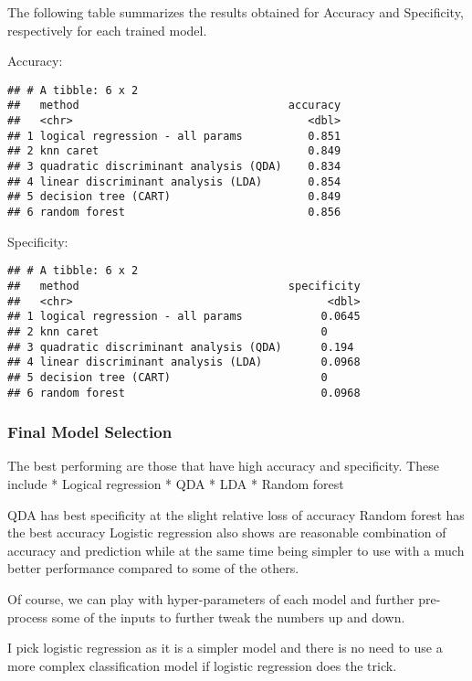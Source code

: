 \documentclass[]{article}
\begin{document}
The following table summarizes the results obtained for Accuracy and
Specificity, respectively for each trained model.

Accuracy:

\begin{verbatim}
## # A tibble: 6 x 2
##   method                                accuracy
##   <chr>                                    <dbl>
## 1 logical regression - all params          0.851
## 2 knn caret                                0.849
## 3 quadratic discriminant analysis (QDA)    0.834
## 4 linear discriminant analysis (LDA)       0.854
## 5 decision tree (CART)                     0.849
## 6 random forest                            0.856
\end{verbatim}

Specificity:

\begin{verbatim}
## # A tibble: 6 x 2
##   method                                specificity
##   <chr>                                       <dbl>
## 1 logical regression - all params            0.0645
## 2 knn caret                                  0     
## 3 quadratic discriminant analysis (QDA)      0.194 
## 4 linear discriminant analysis (LDA)         0.0968
## 5 decision tree (CART)                       0     
## 6 random forest                              0.0968
\end{verbatim}

\subsubsection{Final Model Selection}\label{final-model-selection}

The best performing are those that have high accuracy and specificity.
These include * Logical regression * QDA * LDA * Random forest

QDA has best specificity at the slight relative loss of accuracy Random
forest has the best accuracy Logistic regression also shows are
reasonable combination of accuracy and prediction while at the same time
being simpler to use with a much better performance compared to some of
the others.

Of course, we can play with hyper-parameters of each model and further
pre-process some of the inputs to further tweak the numbers up and down.

I pick logistic regression as it is a simpler model and there is no need
to use a more complex classification model if logistic regression does
the trick.
\end{document}
